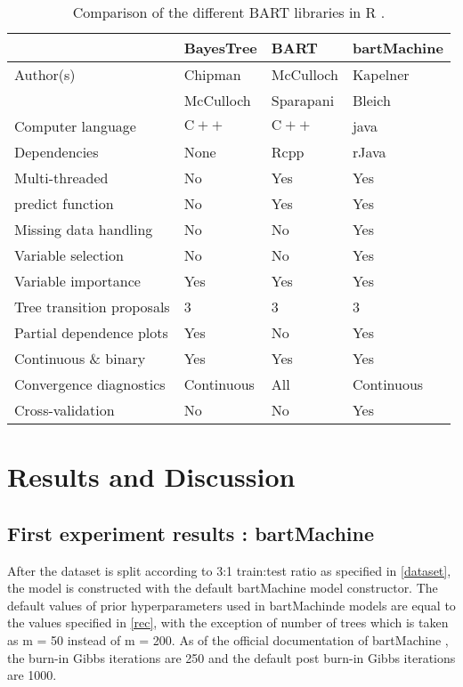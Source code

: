 \documentclass{usiinftr}
\begin{document}
\begin{table}[h!]
\centering
\caption{Comparison of the different BART libraries in R \cite{18}.}
\begin{tabular}{l|lll} 
& BayesTree & BART & bartMachine \\
\hline Author(s) & Chipman & McCulloch & Kapelner \\
& McCulloch & Sparapani & Bleich \\
Computer language & $\mathrm{C}++$ & $\mathrm{C}++$ & java \\
Dependencies & None & Rcpp & rJava \\
Multi-threaded & No & Yes & Yes \\
predict function & No & Yes & Yes \\
Missing data handling & No & No & Yes \\
Variable selection & No & No & Yes \\
Variable importance & Yes & Yes & Yes \\
Tree transition proposals & 3 & 3 & 3 \\
Partial dependence plots & Yes & No & Yes \\
Continuous \& binary & Yes & Yes & Yes \\
Convergence diagnostics & Continuous & All & Continuous \\
Cross-validation & No & No & Yes \\
\hline
\end{tabular}
\end{table}




\section{Results and Discussion}
\subsection{First experiment results : bartMachine}
After the dataset is split according to 3:1 train:test ratio as specified in \ref{dataset}, the model is constructed with the default bartMachine model constructor. The default values of prior hyperparameters used in bartMachinde models are equal to the values specified in \ref{rec}, with the exception of number of trees which is taken as m = 50 instead of m = 200. As of the official documentation of bartMachine \cite{12}, the burn-in Gibbs iterations are 250 and the default post burn-in Gibbs iterations are 1000. 
\end{document}
